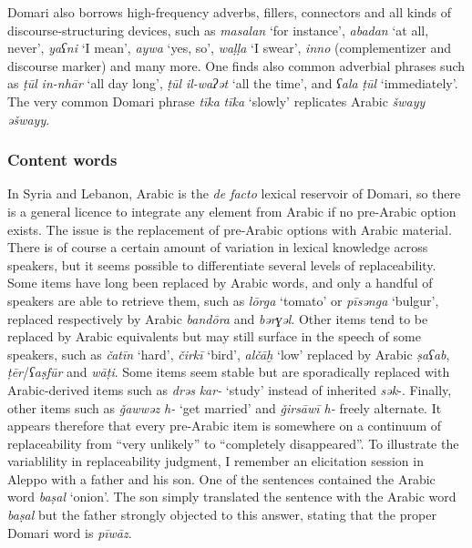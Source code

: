 \documentclass[output=paper]{langsci/langscibook}
\begin{document}
Domari also borrows high-frequency adverbs, fillers, connectors and all kinds of discourse-structuring devices, such as \textit{masalan} ‘for instance’, \textit{abadan} ‘at all, never’, \textit{yaʕni}  ‘I mean’, \textit{aywa} ‘yes, so’, \textit{waḷḷa} ‘I swear’, \textit{inno} (complementizer and discourse marker) and many more. One finds also common adverbial phrases such as \textit{ṭūl} \textit{in-nhār} ‘all day long’, \textit{ṭūl} \textit{il-waʔət} ‘all the time’, and \textit{ʕala} \textit{ṭūl} ‘immediately’.  The very common Domari phrase \textit{tīka} \textit{tīka} ‘slowly’ replicates Arabic \textit{šwayy} \textit{əšwayy}.


 \subsubsection{Content words}

In Syria and Lebanon, Arabic is the \textit{de facto} lexical reservoir of Domari, so there is a general licence to integrate any element from Arabic if no pre-Arabic option exists. The issue is the replacement of pre-Arabic options with Arabic material. There is of course a certain amount of variation in lexical knowledge across speakers, but it seems possible to differentiate several levels of replaceability. Some items have long been replaced by Arabic words, and only a handful of speakers are able to retrieve them, such as \textit{lōrga} ‘tomato’ or \textit{pīsənga} ‘bulgur’, replaced respectively by Arabic \textit{bandōra} and \textit{bərɣəl}. Other items tend to be replaced by Arabic equivalents but may still surface in the speech of some speakers, such as \textit{čatīn} ‘hard’, \textit{čirkī} ‘bird’, \textit{alčāḫ} ‘low’ replaced by Arabic \textit{ṣaʕab}, \textit{ṭēr}/\textit{ʕaṣfūr} and \textit{wāṭi}. Some items seem stable but are sporadically replaced with Arabic-derived items such as \textit{drəs} \textit{kar-} ‘study’ instead of inherited \textit{sək}{}-. Finally, other items  such as \textit{\v{g}awwəz h-} ‘get married’ and \textit{\v{g}irsāwī h-} freely alternate. It appears therefore that every pre-Arabic item is somewhere on a continuum of replaceability from ``very unlikely'' to ``completely disappeared''. To illustrate the variablility in replaceability judgment, I remember an elicitation session in Aleppo with a father and his son. One of the sentences contained the Arabic word \textit{baṣal} ‘onion’. The son simply translated the sentence with the Arabic word \textit{baṣal} but the father strongly objected to this answer, stating that the proper Domari word is \textit{pīwāz}.
\end{document}
